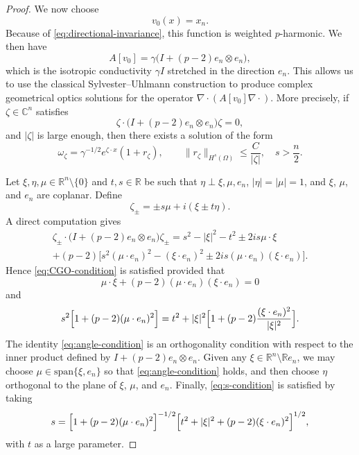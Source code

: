 \documentclass[a4paper,12pt]{article}
\newcommand{\R}{\mathbb{R}}
\newcommand{\C}{\mathbb{C}}
\theoremstyle{definition}
\theoremstyle{remark}
\begin{document}
\begin{proof}
We now choose
\[
v_0(x)=x_n.
\]
Because of \eqref{eq:directional-invariance}, this function is weighted $p$-harmonic. We then have
\[
A[v_0]=\gamma\bigl(I+(p-2)e_n\otimes e_n\bigr),
\]
which is the isotropic conductivity $\gamma I$ stretched in the direction $e_n$. This allows us to use the classical Sylvester--Uhlmann construction \cite{SyUh} to produce complex geometrical optics solutions for the operator $\nabla\cdot(A[v_0]\nabla\cdot)$. More precisely, if $\zeta\in\C^n$ satisfies
\begin{equation}\label{eq:CGO-condition}
\zeta\cdot\bigl(I+(p-2)e_n\otimes e_n\bigr)\zeta=0,
\end{equation}
and $|\zeta|$ is large enough, then there exists a solution of the form
\[
\omega_\zeta=\gamma^{-1/2}e^{\zeta\cdot x}(1+r_\zeta),
\qquad
\|r_\zeta\|_{H^s(\Omega)}\le \frac{C}{|\zeta|},
\quad s>\frac n2.
\]

Let $\xi,\eta,\mu\in\R^n\setminus\{0\}$ and $t,s\in\R$ be such that $\eta\perp\xi,\mu,e_n$, $|\eta|=|\mu|=1$, and $\xi$, $\mu$, and $e_n$ are coplanar. Define
\[
\zeta_\pm=\pm s\mu+i(\xi\pm t\eta).
\]
A direct computation gives
\begin{multline*}
\zeta_\pm\cdot\bigl(I+(p-2)e_n\otimes e_n\bigr)\zeta_\pm
=s^2-|\xi|^2-t^2\pm2is\mu\cdot\xi\\
+(p-2)\Big[s^2(\mu\cdot e_n)^2-(\xi\cdot e_n)^2\pm2is(\mu\cdot e_n)(\xi\cdot e_n)\Big].
\end{multline*}
Hence \eqref{eq:CGO-condition} is satisfied provided that
\begin{equation}\label{eq:angle-condition}
\mu\cdot\xi+(p-2)(\mu\cdot e_n)(\xi\cdot e_n)=0
\end{equation}
and
\begin{equation}\label{eq:s-condition}
s^2\Bigl[1+(p-2)(\mu\cdot e_n)^2\Bigr]=t^2+|\xi|^2\Bigl[1+(p-2)\frac{(\xi\cdot e_n)^2}{|\xi|^2}\Bigr].
\end{equation}
The identity \eqref{eq:angle-condition} is an orthogonality condition with respect to the inner product defined by $I+(p-2)e_n\otimes e_n$. Given any $\xi\in\R^n\setminus\R e_n$, we may choose $\mu\in\mathrm{span}\{\xi,e_n\}$ so that \eqref{eq:angle-condition} holds, and then choose $\eta$ orthogonal to the plane of $\xi$, $\mu$, and $e_n$. Finally, \eqref{eq:s-condition} is satisfied by taking
\[
s=\Bigl[1+(p-2)(\mu\cdot e_n)^2\Bigr]^{-1/2}
\Bigl[t^2+|\xi|^2+(p-2)(\xi\cdot e_n)^2\Bigr]^{1/2},
\]
with $t$ as a large parameter.


\end{proof}
\end{document}
